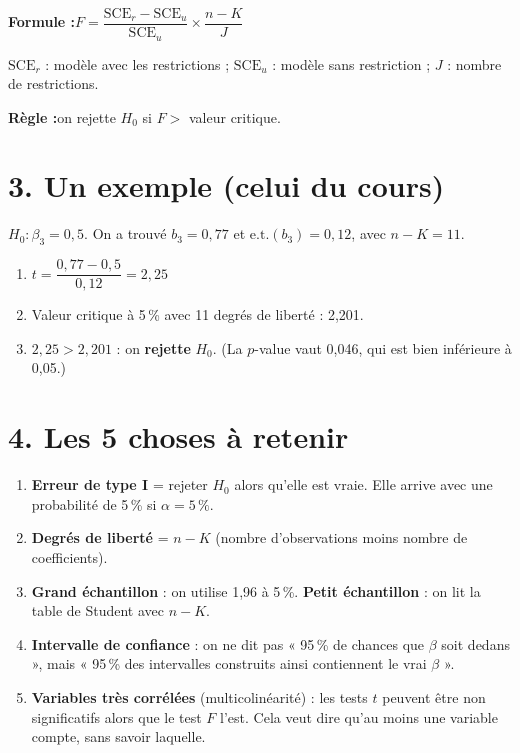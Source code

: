 \documentclass[12pt,a4paper]{article}
\begin{document}
\begin{outil}[title={Test $F$ : tester PLUSIEURS restrictions à la fois}]
\textbf{Formule :}\quad $F=\dfrac{\text{SCE}_r-\text{SCE}_u}{\text{SCE}_u}\times\dfrac{n-K}{J}$

$\text{SCE}_r$ : modèle avec les restrictions ; $\text{SCE}_u$ : modèle sans restriction ; $J$ : nombre de restrictions.

\textbf{Règle :}\quad on rejette $H_0$ si $F>$ valeur critique.
\end{outil}

\newpage
\section*{3. Un exemple (celui du cours)}

$H_0:\beta_3=0{,}5$. On a trouvé $b_3=0{,}77$ et $\text{e.t.}(b_3)=0{,}12$, avec $n-K=11$.

\begin{enumerate}
\item $t=\dfrac{0{,}77-0{,}5}{0{,}12}=2{,}25$
\item Valeur critique à 5\,\% avec 11 degrés de liberté : 2,201.
\item $2{,}25>2{,}201$ : on \textbf{rejette} $H_0$. (La $p$-value vaut 0,046, qui est bien inférieure à 0,05.)
\end{enumerate}

\section*{4. Les 5 choses à retenir}

\begin{enumerate}[itemsep=4pt]
\item \textbf{Erreur de type I} = rejeter $H_0$ alors qu'elle est vraie. Elle arrive avec une probabilité de 5\,\% si $\alpha=5\,\%$.
\item \textbf{Degrés de liberté} = $n-K$ (nombre d'observations moins nombre de coefficients).
\item \textbf{Grand échantillon} : on utilise 1,96 à 5\,\%. \textbf{Petit échantillon} : on lit la table de Student avec $n-K$.
\item \textbf{Intervalle de confiance} : on ne dit pas « 95\,\% de chances que $\beta$ soit dedans », mais « 95\,\% des intervalles construits ainsi contiennent le vrai $\beta$ ».
\item \textbf{Variables très corrélées} (multicolinéarité) : les tests $t$ peuvent être non significatifs alors que le test $F$ l'est. Cela veut dire qu'au moins une variable compte, sans savoir laquelle.
\end{enumerate}
\end{document}
